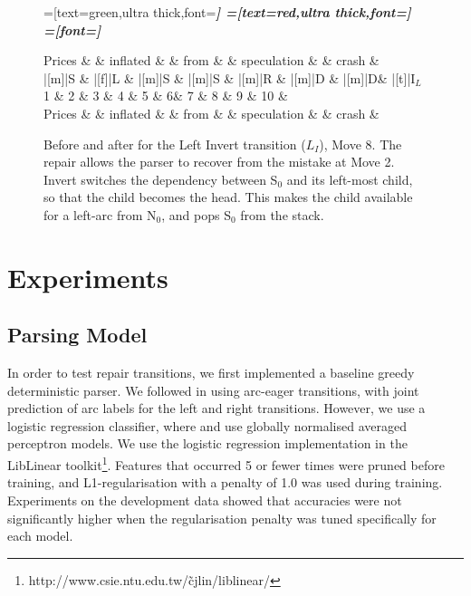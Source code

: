\documentclass[11pt,letterpaper]{article}
\newcommand{\stacktop}{S$_0$\xspace}
\newcommand{\buffone}{N$_0$\xspace}
\begin{document}
\begin{figure}
    \small
    \begin{dependency}[theme=simple]
    =[text=green,ultra thick,font=\bfseries\itshape]
    =[text=red,ultra thick,font=\bfseries\itshape]
    =[font=\bfseries\itshape]


        \begin{deptext}[column sep=.07cm, row sep=.1ex]
    Prices \&        \& inflated \&   \& from \&  \& speculation \&   \& crash \& \\
|[m]|S     \& |[f]|L \& |[m]|S    \& |[m]|S \& |[m]|R  \& |[m]|D    \& |[m]|D\& |[t]|I$_L$   \\
    1      \& 2 \&    3     \& 4 \& 5  \& 6\&  7          \& 8 \& 9 \& 10 \& \\
    Prices \&   \& inflated \&   \& from \&  \& speculation \&   \& crash \&  \\
\end{deptext}



\end{dependency}
\caption{Before and after for the Left Invert transition ($L_I$), Move 8.
         The repair allows the parser to recover from the mistake at Move 2.
         Invert switches the dependency between \stacktop and its left-most child,
         so that the child becomes the head. This makes the child available for
         a left-arc from \buffone, and pops \stacktop from the stack.\label{fig:prices_crash}}
\end{figure}
\clearpage

\section{Experiments}

\subsection{Parsing Model}

In order to test repair transitions, we first implemented a baseline greedy
deterministic parser.
We followed \citet{zhang:11} in using arc-eager transitions, with joint
prediction of arc labels for the left and right transitions.
However, we use a logistic
regression classifier, where \citet{zhang:11} and \citet{goldberg:12} use globally
normalised averaged perceptron models. We use the logistic regression
implementation in the
LibLinear toolkit\footnote{http://www.csie.ntu.edu.tw/\~cjlin/liblinear/}.
Features that occurred 5 or fewer times
were pruned before training, and L1-regularisation with a penalty of 1.0 was
used during training. Experiments on the development data showed that accuracies
were not significantly higher when the regularisation penalty was tuned
specifically for each model.
\end{document}
